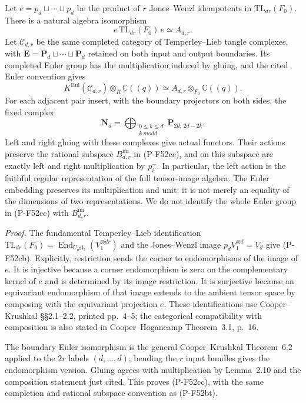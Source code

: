 Let
$e=p_d\sqcup\cdots\sqcup p_d$ be the product of $r$
Jones--Wenzl idempotents in $\mathrm{TL}_{dr}(F_0)$.
There is a natural algebra isomorphism
\[
                e\,\mathrm{TL}_{dr}(F_0)\,e
                           \simeq A_{d,r}.
                                                               \tag{P-F52cb}
\]
Let $\mathscr C_{d,r}$ be the same completed category of
Temperley--Lieb tangle complexes, with
$\mathbf E=\mathbf P_d\sqcup\cdots\sqcup\mathbf P_d$
retained on both input and output boundaries.
Its completed Euler group has the multiplication induced
by gluing, and the cited Euler convention gives
\[
 K^{\mathrm{Eul}}(\mathscr C_{d,r})
       \otimes_{\widehat R}\mathbb C((q))
          \simeq A_{d,r}\otimes_{F_0}\mathbb C((q)).
                                                               \tag{P-F52cc}
\]
For each adjacent pair insert, with the boundary projectors
on both sides, the fixed complex
\[
        \mathbf N_d
          =\bigoplus_{\substack{0\le k\le d\\k\ {
m odd}}}
                      \mathbf P_{2d,\,2d-2k}.
                                                               \tag{P-F52cd}
\]
Left and right gluing with these complexes give actual
functors.  Their actions preserve the rational subspace
$B^{\mathrm{im}}_{d,r}$ in (P-F52cc), and on this subspace
are exactly left and right multiplication by $p^-_i$.
In particular, the left action is the faithful regular
representation of the full tensor-image algebra.
The Euler embedding preserves its multiplication and unit;
it is not merely an equality of the dimensions of two
representations.  We do not identify the whole Euler group
in (P-F52cc) with $B^{\mathrm{im}}_{d,r}$.

\emph{Proof.}
The fundamental Temperley--Lieb identification
$\mathrm{TL}_{dr}(F_0)=
\operatorname{End}_{U_q\mathfrak{sl}_2}(V_1^{\otimes dr})$
and the Jones--Wenzl image $p_dV_1^{\otimes d}=V_d$
give (P-F52cb).  Explicitly, restriction sends the corner
to endomorphisms of the image of $e$.  It is injective
because a corner endomorphism is zero on the complementary
kernel of $e$ and is determined by its image restriction.
It is surjective because an equivariant endomorphism of
that image extends to the ambient tensor space by composing
with the equivariant projection $e$.
These identifications use Cooper--Krushkal \S\S2.1--2.2,
printed pp.~4--5; the categorical compatibility with
composition is also stated in Cooper--Hogancamp
Theorem~3.1, p.~16.

The boundary Euler isomorphism is the general
Cooper--Krushkal Theorem~6.2 applied to the $2r$ labels
$(d,\ldots,d)$; bending the $r$ input bundles gives the
endomorphism version.  Gluing agrees with multiplication
by Lemma~2.10 and the composition statement just cited.
This proves (P-F52cc), with the same completion and rational
subspace convention as (P-F52bt).

